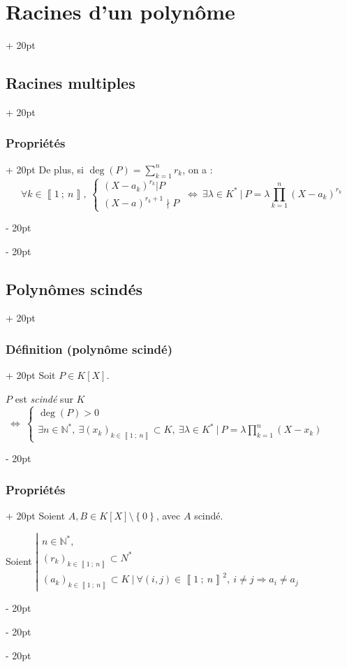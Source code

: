 \documentclass[a4paper, 12pt, twoside]{article}
\newcommand{\N}{\mathbb{N}} %
\newcommand{\nset}[2]{\left\llbracket #1\ ;\ #2 \right\rrbracket}
\newcommand{\ssi}{\ \Leftrightarrow \ }
\newcommand{\eqsys}[2]{\begin{cases} #1 \\ #2 \end{cases}}
\newcommand{\set}[1]{\left\{ #1 \right\}}
\newcommand{\ind}[1][20pt]{\advance\leftskip + #1}
\newcommand{\deind}[1][20pt]{\advance\leftskip - #1}
\newenvironment{indt}[2][20pt]{#2 \par \ind[#1]}{\par \deind} %
\begin{document}
\begin{indt}{\section{Racines d'un polynôme}}
\begin{indt}{\subsection{Racines multiples}}
\begin{indt}{\subsubsection{Propriétés}}
                De plus, si $\displaystyle \deg(P) = \sum_{k = 1}^n r_k$, on a :
                    \[
                        \forall k \in \nset 1 n,\
                        \eqsys{(X - a_k)^{r_k} | P}{(X - a)^{r_k + 1} \nmid P}
                        \ssi
                        \exists \lambda \in K^*\ |\ P = \lambda \prod_{k = 1}^n (X - a_k)^{r_k}
                    \]
            \end{indt}
        \end{indt}
        
        \vspace{12pt}
        
        \begin{indt}{\subsection{Polynômes scindés}}
            \begin{indt}{\subsubsection{Définition (polynôme scindé)}}
                Soit $P \in K[X]$.
                
                $P$ est \textit{scindé} sur $K$
                $
                    \ssi \eqsys
                        {\deg(P) > 0}
                        {\exists n \in \N^*,\ \exists (x_k)_{k \in \nset 1 n} \subset K,\ \exists \lambda \in K^*\ |\ P = \displaystyle \lambda \prod_{k = 1}^n (X - x_k)}
                $
            \end{indt}
            
            \vspace{12pt}
            
            \begin{indt}{\subsubsection{Propriétés}}
                Soient $A, B \in K[X] \setminus \set 0$, avec $A$ scindé.
                
                Soient
                $
                    \left|
                    \begin{array}{l}
                        n \in \N^*,
                        \\
                        (r_k)_{k \in \nset 1 n} \subset N^*
                        \\
                        (a_k)_{k \in \nset 1 n} \subset K\ |\ \forall (i, j) \in \nset 1 n ^2,\ i \neq j \Rightarrow a_i \neq a_j
                    \end{array}
                    \right.
                $
                

\end{indt}
\end{indt}
\end{indt}
\end{document}
